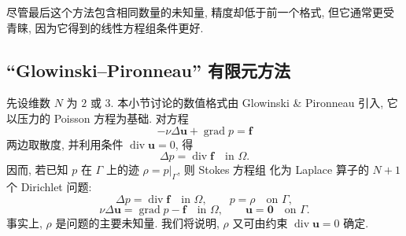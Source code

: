 \setcounter{statement}{3}
\renewcommand{\theHstatement}{remark.\thesection.\arabic{statement}}
\begin{Remark}\label{rem:primitive-refined-p1-p1-conditioning}
尽管最后这个方法包含相同数量的未知量, 精度却低于前一个格式, 但它通常更受
青睐, 因为它得到的线性方程组条件更好.
\end{Remark}

\subsection{``Glowinski--Pironneau'' 有限元方法}
\label{subsec:primitive-glowinski-pironneau}

先设维数 $N$ 为 $2$ 或 $3$. 本小节讨论的数值格式由
Glowinski \& Pironneau 引入, 它以压力的 Poisson 方程为基础. 对方程
\[
-\nu\Delta\mathbf u+\operatorname{grad}p=\mathbf f
\]
两边取散度, 并利用条件 $\operatorname{div}\mathbf u=0$, 得
\[
\Delta p=\operatorname{div}\mathbf f\quad\text{in }\Omega.
\]
因而, 若已知 $p$ 在 $\Gamma$ 上的迹 $\rho=p|_\Gamma$, 则 Stokes 方程组
化为 Laplace 算子的 $N+1$ 个 Dirichlet 问题:
\begin{equation}\label{eq:primitive-gp-pressure-dirichlet}
\Delta p=\operatorname{div}\mathbf f\quad\text{in }\Omega,
\qquad p=\rho\quad\text{on }\Gamma,
\end{equation}
\begin{equation}\label{eq:primitive-gp-velocity-dirichlet}
\nu\Delta\mathbf u=\operatorname{grad}p-\mathbf f\quad\text{in }\Omega,
\qquad\mathbf u=\mathbf0\quad\text{on }\Gamma.
\end{equation}
事实上, $\rho$ 是问题的主要未知量. 我们将说明, $\rho$ 又可由约束
$\operatorname{div}\mathbf u=0$ 确定.

